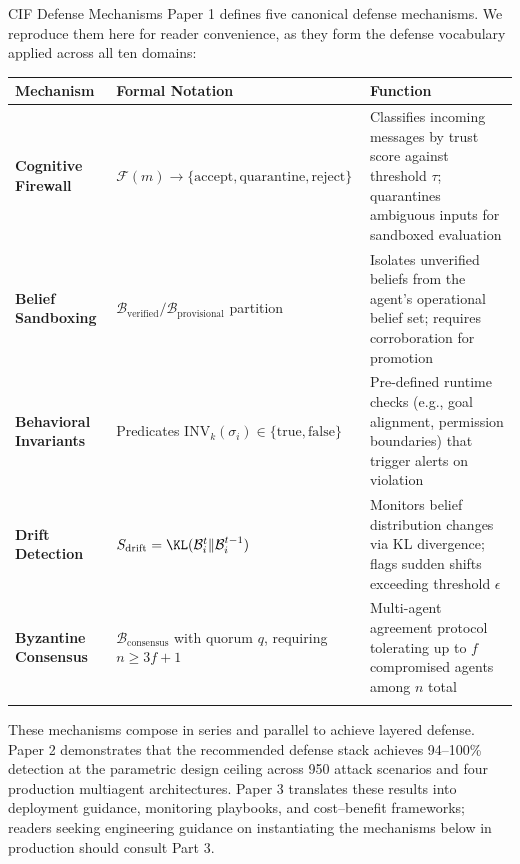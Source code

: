 \documentclass[
  ignorenonframetext,
]{beamer}
\newcounter{none} %
\begin{document}
\begin{frame}[allowframebreaks]{CIF Defense Mechanisms}
\protect{}\label{cif-defense-mechanisms}
Paper 1 \cite{friedman2026cogsec1} defines five canonical defense
mechanisms. We reproduce them here for reader convenience, as they form
the defense vocabulary applied across all ten domains:

{\def\LTcaptype{none} %
\begin{longtable}[]{@{}
  >{\raggedright\arraybackslash}p{}
  >{\raggedright\arraybackslash}p{}
  >{\raggedright\arraybackslash}p{}@{}}
\toprule\noalign{}
\begin{minipage}[b]{\linewidth}\raggedright
Mechanism
\end{minipage} & \begin{minipage}[b]{\linewidth}\raggedright
Formal Notation
\end{minipage} & \begin{minipage}[b]{\linewidth}\raggedright
Function
\end{minipage} \\
\midrule\noalign{}
\endhead
\textbf{Cognitive Firewall} &
\(\mathcal{F}(m) \to \{\text{accept}, \text{quarantine}, \text{reject}\}\)
& Classifies incoming messages by trust score against threshold
\(\tau\); quarantines ambiguous inputs for sandboxed evaluation \\
\textbf{Belief Sandboxing} &
\(\mathcal{B}_{\text{verified}} / \mathcal{B}_{\text{provisional}}\)
partition & Isolates unverified beliefs from the agent's operational
belief set; requires corroboration for promotion \\
\textbf{Behavioral Invariants} & Predicates
\(\text{INV}_k(\sigma_i) \in \{\text{true}, \text{false}\}\) &
Pre-defined runtime checks (e.g., goal alignment, permission boundaries)
that trigger alerts on violation \\
\textbf{Drift Detection} &
\(S_{\text{drift}} = \KL(\mathcal{B}_i^t \| \mathcal{B}_i^{t-1})\) &
Monitors belief distribution changes via KL divergence; flags sudden
shifts exceeding threshold \(\epsilon\) \\
\textbf{Byzantine Consensus} & \(\mathcal{B}_{\text{consensus}}\) with
quorum \(q\), requiring \(n \geq 3f+1\) & Multi-agent agreement protocol
tolerating up to \(f\) compromised agents among \(n\) total \\
\bottomrule\noalign{}
\end{longtable}
}

These mechanisms compose in series and parallel to achieve layered
defense. Paper 2 \cite{friedman2026cogsec2} demonstrates that the
recommended defense stack achieves 94--100\% detection at the parametric
design ceiling across 950 attack scenarios and four production
multiagent architectures. Paper 3 \cite{friedman2026cogsec3} translates
these results into deployment guidance, monitoring playbooks, and
cost--benefit frameworks; readers seeking engineering guidance on
instantiating the mechanisms below in production should consult Part 3.
\end{frame}
\end{document}
